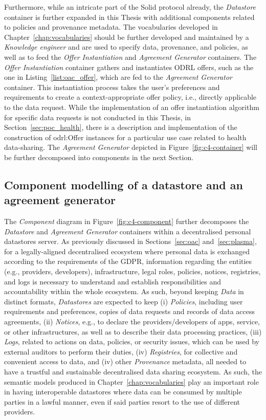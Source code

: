 Furthermore, while an intricate part of the Solid protocol already, the \textit{Datastore} container is further expanded in this Thesis with additional components related to policies and provenance metadata.
The vocabularies developed in Chapter~\ref{chap:vocabularies} should be further developed and maintained by a \textit{Knowledge engineer} and are used to specify data, provenance, and policies, as well as to feed the \textit{Offer Instantiation} and \textit{Agreement Generator} containers.
The \textit{Offer Instantiation} container gathers and instantiates ODRL offers, such as the one in Listing~\ref{list:oac_offer}, which are fed to the \textit{Agreement Generator} container.
This instantiation process takes the user's preferences and requirements to create a context-appropriate offer policy, i.e., directly applicable to the data request.
While the implementation of an offer instantiation algorithm for specific data requests is not conducted in this Thesis, in Section~\ref{sec:poc_health}, there is a description and implementation of the construction of odrl:Offer instances for a particular use case related to health data-sharing.
The \textit{Agreement Generator} depicted in Figure~\ref{fig:c4-container} will be further decomposed into components in the next Section.

\subsection{Component modelling of a datastore and an agreement generator}
\label{sec:c4_component}

The \textit{Component} diagram in Figure~\ref{fig:c4-component} further decomposes the \textit{Datastore} and \textit{Agreement Generator} containers within a decentralised personal datastores server.
As previously discussed in Sections~\ref{sec:oac} and~\ref{sec:plasma}, for a legally-aligned decentralised ecosystem where personal data is exchanged according to the requirements of the GDPR, information regarding the entities (e.g., providers, developers), infrastructure, legal roles, policies, notices, registries, and logs is necessary to understand and establish responsibilities and accountability within the whole ecosystem.
As such, beyond keeping \textit{Data} in distinct formats, \textit{Datastores} are expected to keep (i) \textit{Policies}, including user requirements and preferences, copies of data requests and records of data access agreements, (ii) \textit{Notices}, e.g., to declare the providers/developers of apps, service, or other infrastructures, as well as to describe their data processing practices, (iii) \textit{Logs}, related to actions on data, policies, or security issues, which can be used by external auditors to perform their duties, (iv) \textit{Registries}, for collective and convenient access to data, and (iv) other \textit{Provenance} metadata, all needed to have a trustful and sustainable decentralised data sharing ecosystem.
As such, the semantic models produced in Chapter~\ref{chap:vocabularies} play an important role in having interoperable datastores where data can be consumed by multiple parties in a lawful manner, even if said parties resort to the use of different providers.

